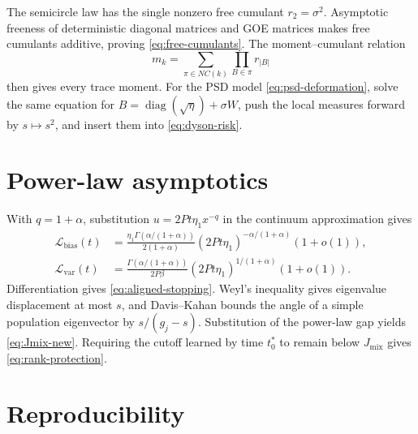 \documentclass{article}
\newcommand{\diag}{\operatorname{diag}}
\begin{document}
The semicircle law has the single nonzero free cumulant
\(r_2=\sigma^2\).  Asymptotic freeness of deterministic diagonal matrices and
GOE matrices makes free cumulants additive, proving
\eqref{eq:free-cumulants}.  The moment--cumulant relation
\begin{equation}
m_k=\sum_{\pi\in NC(k)}\prod_{B\in\pi}r_{|B|}
\end{equation}
then gives every trace moment.  For the PSD model
\eqref{eq:psd-deformation}, solve the same equation for
\(B=\diag(\sqrt\eta)+\sigma W\), push the local measures forward by
\(s\mapsto s^2\), and insert them into \eqref{eq:dyson-risk}.

\section{Power-law asymptotics}
\label{app:powerlaw}

With \(q=1+\alpha\), substitution
\(u=2Pt\eta_1x^{-q}\) in the continuum approximation gives
\begin{align}
\mathcal L_{\mathrm{bias}}(t)
&=\frac{\eta_1\Gamma(\alpha/(1+\alpha))}{2(1+\alpha)}
(2Pt\eta_1)^{-\alpha/(1+\alpha)}(1+o(1)),\\
\mathcal L_{\mathrm{var}}(t)
&=\frac{\Gamma(\alpha/(1+\alpha))}{2P\beta}
(2Pt\eta_1)^{1/(1+\alpha)}(1+o(1)).
\end{align}
Differentiation gives \eqref{eq:aligned-stopping}.  Weyl's inequality gives
eigenvalue displacement at most \(s\), and Davis--Kahan bounds the angle of a
simple population eigenvector by \(s/(g_j-s)\).  Substitution of the
power-law gap yields \eqref{eq:Jmix-new}.  Requiring the cutoff learned by
time \(t_0^*\) to remain below \(J_{\mathrm{mix}}\) gives
\eqref{eq:rank-protection}.

\section{Reproducibility}
\end{document}
